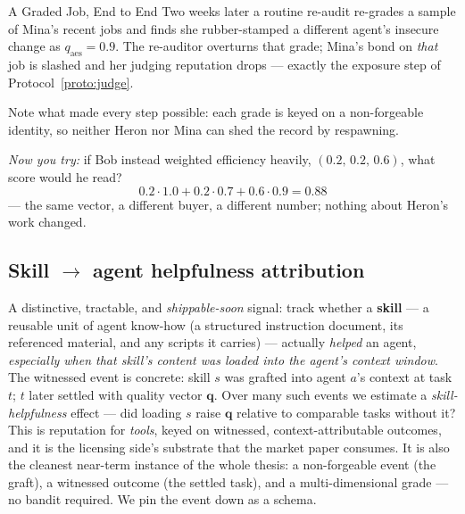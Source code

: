 \documentclass[11pt,a4paper]{article}
\theoremstyle{definition}
\begin{document}
\begin{pdexample}{A Graded Job, End to End}
Two weeks later a routine re-audit re-grades a sample of Mina's recent
jobs and finds she rubber-stamped a different agent's insecure change as
$q_{\text{aes}}=0.9$. The re-auditor overturns that grade; Mina's bond on
\emph{that} job is slashed and her judging reputation drops --- exactly the
exposure step of Protocol~\ref{proto:judge}.

Note what made every step possible:
each grade is keyed on a non-forgeable identity, so neither Heron nor Mina can shed
the record by respawning.

\emph{Now you try:} if Bob instead weighted
efficiency heavily, $(0.2,\,0.2,\,0.6)$, what score would he read?
\[
0.2\cdot1.0+0.2\cdot0.7+0.6\cdot0.9=0.88
\]
--- the same vector, a different
buyer, a different number; nothing about Heron's work changed.
\end{pdexample}

\subsection{Skill $\to$ agent helpfulness attribution}

A distinctive, tractable, and \emph{shippable-soon} signal: track whether a
\textbf{skill} --- a reusable unit of agent know-how (a structured instruction
document, its referenced material, and any scripts it carries) --- actually
\emph{helped} an agent, \emph{especially when that skill's content was loaded into
the agent's context window}. The witnessed event is concrete: skill $s$ was grafted
into agent $a$'s context at task $t$; $t$ later settled with quality vector
$\mathbf{q}$. Over many such events we estimate a \emph{skill-helpfulness} effect
--- did loading $s$ raise $\mathbf{q}$ relative to comparable tasks without it? This
is reputation for \emph{tools}, keyed on witnessed, context-attributable outcomes,
and it is the licensing side's substrate that the market paper consumes. It is also
the cleanest near-term instance of the whole thesis: a non-forgeable event (the
graft), a witnessed outcome (the settled task), and a multi-dimensional grade ---
no bandit required. We pin the event down as a schema.
\end{document}
